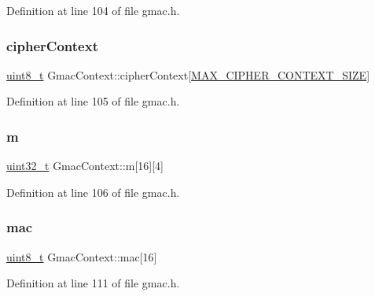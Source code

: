 Definition at line 104 of file gmac.\+h.

\mbox{\label{structGmacContext_a5e191ffa77ad12e87ef45bf73d63fd9c}} 
\subsubsection{\texorpdfstring{cipher\+Context}{cipherContext}}
{\footnotesize\ttfamily \hyperlink{stdint_8h_aba7bc1797add20fe3efdf37ced1182c5}{uint8\+\_\+t} Gmac\+Context\+::cipher\+Context\mbox{[}\hyperlink{cyclone__crypto_2core_2crypto_8h_a99fb8f5b5cc906fd435df00c1720f7ad}{M\+A\+X\+\_\+\+C\+I\+P\+H\+E\+R\+\_\+\+C\+O\+N\+T\+E\+X\+T\+\_\+\+S\+I\+ZE}\mbox{]}}



Definition at line 105 of file gmac.\+h.

\mbox{\label{structGmacContext_aee713037ed85ba9ec892d297044a1d1a}} 
\subsubsection{\texorpdfstring{m}{m}}
{\footnotesize\ttfamily \hyperlink{stdint_8h_a435d1572bf3f880d55459d9805097f62}{uint32\+\_\+t} Gmac\+Context\+::m\mbox{[}16\mbox{]}\mbox{[}4\mbox{]}}



Definition at line 106 of file gmac.\+h.

\mbox{\label{structGmacContext_adfb28cc9aa3f86ca3b0d2a294a5eeaf1}} 
\subsubsection{\texorpdfstring{mac}{mac}}
{\footnotesize\ttfamily \hyperlink{stdint_8h_aba7bc1797add20fe3efdf37ced1182c5}{uint8\+\_\+t} Gmac\+Context\+::mac\mbox{[}16\mbox{]}}



Definition at line 111 of file gmac.\+h.

\mbox{\label{structGmacContext_aba6a64b74fb0cf05d78d759257ab8c2b}} 
